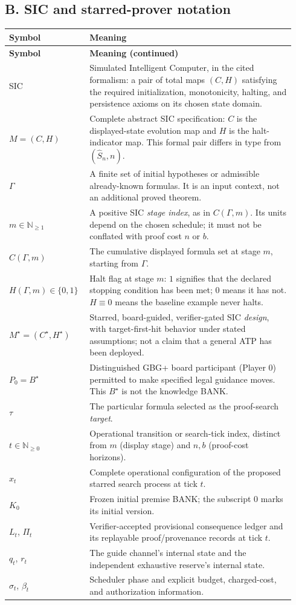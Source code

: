 \documentclass[11pt,letterpaper]{article}
\begin{document}
\subsection*{B. SIC and starred-prover notation}
{\small
\renewcommand{\arraystretch}{1.15}
\begin{longtable}{@{}p{0.245\linewidth}p{0.695\linewidth}@{}}
\toprule
\textbf{Symbol} & \textbf{Meaning}\\ \midrule
\endfirsthead
\toprule \textbf{Symbol} & \textbf{Meaning (continued)}\\ \midrule
\endhead
SIC & Simulated Intelligent Computer, in the cited formalism: a pair of total maps $(C,H)$ satisfying the required initialization, monotonicity, halting, and persistence axioms on its chosen state domain.\\
$M=(C,H)$ & Complete abstract SIC specification: $C$ is the displayed-state evolution map and $H$ is the halt-indicator map. This formal pair differs in type from $(\widehat S_n,n)$.\\
$\Gamma$ & A finite set of initial hypotheses or admissible already-known formulas. It is an input context, not an additional proved theorem.\\
$m\in\mathbb N_{\ge1}$ & A positive SIC \emph{stage index}, as in $C(\Gamma,m)$. Its units depend on the chosen schedule; it must not be conflated with proof cost $n$ or $b$.\\
$C(\Gamma,m)$ & The cumulative displayed formula set at stage $m$, starting from $\Gamma$.\\
$H(\Gamma,m)\in\{0,1\}$ & Halt flag at stage $m$: $1$ signifies that the declared stopping condition has been met; $0$ means it has not. $H\equiv0$ means the baseline example never halts.\\
$M^\star=(C^\star,H^\star)$ & Starred, board-guided, verifier-gated SIC \emph{design}, with target-first-hit behavior under stated assumptions; not a claim that a general ATP has been deployed.\\
$P_0=B^\star$ & Distinguished GBG+ board participant (Player 0) permitted to make specified legal guidance moves. This $B^\star$ is not the knowledge BANK.\\
$\tau$ & The particular formula selected as the proof-search \emph{target}.\\
$t\in\mathbb N_{\ge0}$ & Operational transition or search-tick index, distinct from $m$ (display stage) and $n,b$ (proof-cost horizons).\\
$x_t$ & Complete operational configuration of the proposed starred search process at tick $t$.\\
$K_0$ & Frozen initial premise BANK; the subscript $0$ marks its initial version.\\
$L_t$, $\Pi_t$ & Verifier-accepted provisional consequence ledger and its replayable proof/provenance records at tick $t$.\\
$q_t$, $r_t$ & The guide channel's internal state and the independent exhaustive reserve's internal state.\\
$\sigma_t$, $\beta_t$ & Scheduler phase and explicit budget, charged-cost, and authorization information.\\
\bottomrule
\end{longtable}
}
\end{document}
